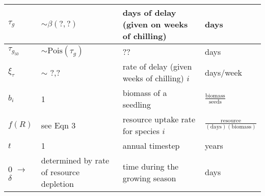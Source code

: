 \documentclass[11pt,letter]{article}
\begin{document}
\begin{center}
\begin{table}[h!]
\begin{tabular}{ | p{2.0cm} | p{3.5cm} | p{5.0cm} | p{4.0cm} |}
\(\tau_{g}\) & $\sim \beta(?,?)$ & days of delay (given on weeks of chilling) & days \\ \hline
\(\tau_{g_{50}}\) & $\sim \mathrm{Pois}(\tau_{g})$ & ?? & days \\ \hline
\(\xi_{\tau}\) & $\sim$ ?,? & rate of delay (given weeks of chilling) \(i\) & days/week \\ \hline
\hline
\(b_{i}\) & 1 & biomass of a seedling & \(\frac{\text{biomass}}{\text{seeds}}\) \\ \hline
\(f(R)\) & see Eqn 3& resource uptake rate for species \(i\) & \(\frac{\text{resource}}{(\text{days})(\text{biomass})}\)\\ \hline
 \hline
\(t\) & 1 & annual timestep & years \\ \hline
\(0\) $\rightarrow$ \(\delta\) & determined by rate of resource depletion & time during the growing season & days \\ \hline
\hline
\end{tabular}
\label{tab:model}
\end{table}
\end{center}
\end{document}
